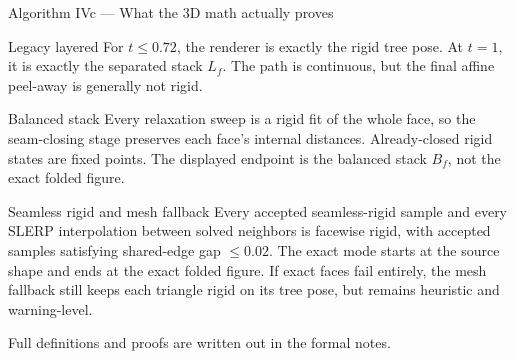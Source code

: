 \documentclass[aspectratio=169,10pt]{beamer}
\begin{document}
\begin{frame}{Algorithm IVc — What the 3D math actually proves}
\begin{block}{Legacy layered}
\footnotesize For \(t\le0.72\), the renderer is exactly the rigid tree pose.
At \(t=1\), it is exactly the separated stack \(L_f\). The path is continuous,
but the final affine peel-away is generally \alert{not} rigid.
\end{block}

\begin{block}{Balanced stack}
\footnotesize Every relaxation sweep is a rigid fit of the whole face, so the
seam-closing stage preserves each face's internal distances. Already-closed
rigid states are fixed points. The displayed endpoint is the balanced stack
\(B_f\), not the exact folded figure.
\end{block}

\begin{alertblock}{Seamless rigid and mesh fallback}
\footnotesize Every accepted seamless-rigid sample and every SLERP
interpolation between solved neighbors is facewise rigid, with accepted samples
satisfying shared-edge gap \(\le 0.02\). The exact mode starts at the source
shape and ends at the exact folded figure. If exact faces fail entirely, the
mesh fallback still keeps each triangle rigid on its tree pose, but remains
heuristic and warning-level.
\end{alertblock}

\smallskip
\footnotesize Full definitions and proofs are written out in the formal notes.
\end{frame}
\end{document}
